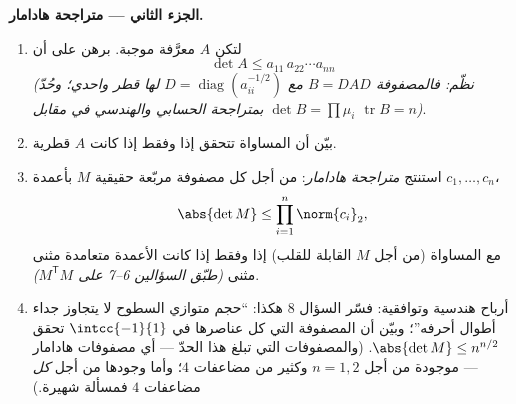 \begin{problem}
\medskip
\noindent\textbf{الجزء الثاني --- متراجحة هادامار.}
\begin{enumerate}[resume]
  \item لتكن $A$ معرَّفة موجبة. برهن على أن
        \[
        \det A \leq a_{11}\,a_{22}\cdots a_{nn}
        \]
        \emph{(نظّم: فالمصفوفة $B = DAD$ مع $D =
        \operatorname{diag}(a_{ii}^{-1/2})$ لها قطر واحدي؛
        وحُدّ $\det B = \prod \mu_i$ بمتراجحة الحسابي والهندسي في مقابل
        $\operatorname{tr} B = n$)}.
  \item بيّن أن المساواة تتحقق إذا وفقط إذا كانت $A$ قطرية.
  \item استنتج \emph{متراجحة هادامار}: من أجل كل مصفوفة
        مربّعة حقيقية $M$ بأعمدة $c_1, \dots, c_n$،
        \[
        \abs{\det M} \leq \prod_{i=1}^{n}\norm{c_i}_2 ,
        \]
        مع المساواة (من أجل $M$ القابلة للقلب) إذا وفقط إذا كانت الأعمدة
        متعامدة مثنى مثنى \emph{(طبّق السؤالين 6--7 على
        $M^{\mathsf T}M$)}.
  \item أرباح هندسية وتوافقية: فسّر
        السؤال 8 هكذا: ``حجم متوازي السطوح لا يتجاوز
        جداء أطوال أحرفه''؛ وبيّن أن
        المصفوفة التي كل عناصرها في $\intcc{-1}{1}$ تحقق
        $\abs{\det M} \leq n^{n/2}$. (والمصفوفات التي تبلغ هذا
        الحدّ --- أي مصفوفات هادامار --- موجودة من أجل $n = 1, 2$
        وكثير من مضاعفات $4$؛ وأما وجودها من أجل \emph{كل}
        مضاعفات $4$ فمسألة  شهيرة.)
\end{enumerate}


\end{problem}
